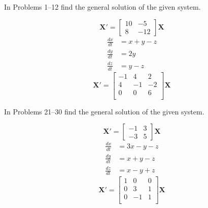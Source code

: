 \documentclass[chapter=8,section=2]{math252homework}
\begin{document}
In Problems 1--12 find the general solution of the given system.
\begin{problems}[start=5]
	\problem \[ \mathbf{X'} = \left[ \begin{array}{cc}
		10 & -5\\ 8 & -12 \end{array} \right]\mathbf{X} \]			%
	\setcounter{problemsi}{6}
	\problem \begin{equation*}
	\begin{aligned}
		\frac{dx}{dt} &= x + y - z\\
		\frac{dy}{dt} &= 2y\\
		\frac{dz}{dt} &= y - z
	\end{aligned}
	\end{equation*}			%
	\setcounter{problemsi}{11}
	\problem \[ \mathbf{X'} = \left[ \begin{array}{rrr}
		-1 & 4 & 2\\
		4 & -1 & -2\\
		0 & 0 & 6\\
	\end{array} \right]\mathbf{X} \]			%
\end{problems}

In Problems 21--30 find the general solution of the given system.
\begin{problems}[start=23]
	\problem \[ \mathbf{X'} = \left[ \begin{array}{cc}
		-1 & 3\\ -3 & 5 \end{array} \right]\mathbf{X} \]			%
	\setcounter{problemsi}{24}
	\problem \begin{equation*}
	\begin{aligned}
		\frac{dx}{dt} &= 3x - y - z\\
		\frac{dy}{dt} &= x + y - z\\
		\frac{dz}{dt} &= x - y + z
	\end{aligned}
	\end{equation*}			%
	\setcounter{problemsi}{27}
	\problem \[ \mathbf{X'} = \left[ \begin{array}{rrr}
		1 & 0 & 0\\
		0 & 3 & 1\\
		0 & -1 & 1\\
	\end{array} \right]\mathbf{X} \]			%
\end{problems}
\end{document}
